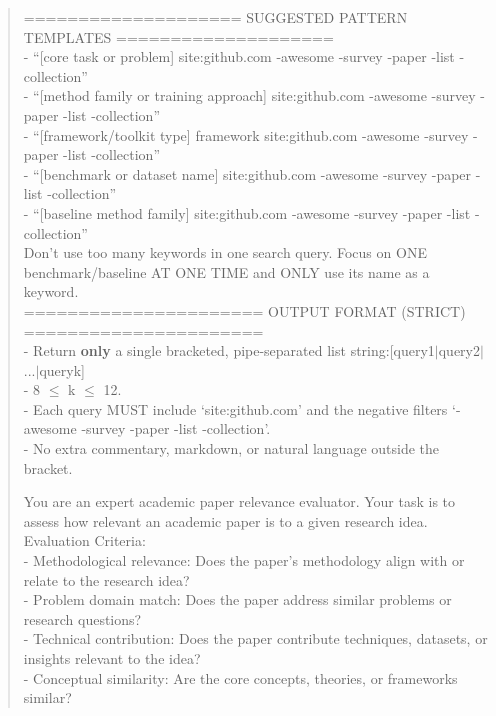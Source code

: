 \begin{quote}
\begin{tcolorbox}[breakable,colback=search!20!white, colframe=search!60!black, title=\textbf{Prompt for Search Agent (Query Generation - Code)}]
        ==================== SUGGESTED PATTERN TEMPLATES  ====================\\
        - ``[core task or problem] site:github.com -awesome -survey -paper -list -collection''\\
        - ``[method family or training approach] site:github.com -awesome -survey -paper -list -collection''\\
        - ``[framework/toolkit type] framework site:github.com -awesome -survey -paper -list -collection''\\
        - ``[benchmark or dataset name] site:github.com -awesome -survey -paper -list -collection''\\
        - ``[baseline method family] site:github.com -awesome -survey -paper -list -collection''\\

        Don't use too many keywords in one search query. Focus on ONE benchmark/baseline AT ONE TIME and ONLY use its name as a keyword.\\

        ====================== OUTPUT FORMAT (STRICT) ======================\\
        - Return \textbf{only} a single bracketed, pipe-separated list string:[query1$\mid$query2$\mid$...$\mid$queryk]\\
        - 8 $\leq$ k $\leq$ 12.\\
        - Each query MUST include `site:github.com' and the negative filters `-awesome -survey -paper -list -collection'.\\
        - No extra commentary, markdown, or natural language outside the bracket.\\
    \end{tcolorbox}
    
    \begin{tcolorbox}[breakable,colback=search!20!white, colframe=search!60!black, title=\textbf{Prompt for Search Agent (Search Results Scoring - Literature)}]
    \label{app:prompt_search_score_literature}
        You are an expert academic paper relevance evaluator. Your task is to assess how relevant an academic paper is to a given research idea.\\

        Evaluation Criteria:\\
        - Methodological relevance: Does the paper's methodology align with or relate to the research idea?\\
        - Problem domain match: Does the paper address similar problems or research questions?\\
        - Technical contribution: Does the paper contribute techniques, datasets, or insights relevant to the idea?\\
        - Conceptual similarity: Are the core concepts, theories, or frameworks similar?\\


\end{tcolorbox}
\end{quote}
